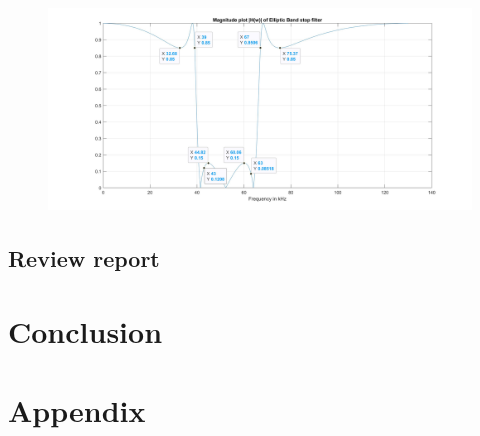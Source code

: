\documentclass[12pt]{article}
\begin{document}
\begin{figure}[H]
	\centering
\	\includegraphics[width = 18cm, trim=0cm 0cm 0cm 0cm, clip]{Filter4DBSF.jpg}
\end{figure}

\color{cyan}
\subsection{Review report}
\color{black}
\newpage
\color{darkblue}
\section{Conclusion}
\color{black}

\color{darkblue}
\section{Appendix}
\color{black}
\end{document}
